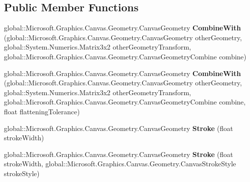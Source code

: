 \subsection*{Public Member Functions}
\begin{DoxyCompactItemize}
\item 
\mbox{\label{interface_microsoft_1_1_graphics_1_1_canvas_1_1_geometry_1_1_i_canvas_geometry_a6815c1deb8e9baa248c965b9a8f12fe7}} 
global\+::\+Microsoft.\+Graphics.\+Canvas.\+Geometry.\+Canvas\+Geometry {\bfseries Combine\+With} (global\+::\+Microsoft.\+Graphics.\+Canvas.\+Geometry.\+Canvas\+Geometry other\+Geometry, global\+::\+System.\+Numerics.\+Matrix3x2 other\+Geometry\+Transform, global\+::\+Microsoft.\+Graphics.\+Canvas.\+Geometry.\+Canvas\+Geometry\+Combine combine)
\item 
\mbox{\label{interface_microsoft_1_1_graphics_1_1_canvas_1_1_geometry_1_1_i_canvas_geometry_a9dbfa5fa955580afeef0c2a26e0281b9}} 
global\+::\+Microsoft.\+Graphics.\+Canvas.\+Geometry.\+Canvas\+Geometry {\bfseries Combine\+With} (global\+::\+Microsoft.\+Graphics.\+Canvas.\+Geometry.\+Canvas\+Geometry other\+Geometry, global\+::\+System.\+Numerics.\+Matrix3x2 other\+Geometry\+Transform, global\+::\+Microsoft.\+Graphics.\+Canvas.\+Geometry.\+Canvas\+Geometry\+Combine combine, float flattening\+Tolerance)
\item 
\mbox{\label{interface_microsoft_1_1_graphics_1_1_canvas_1_1_geometry_1_1_i_canvas_geometry_a9bbabef2bcb23c5f82d026f2b161dac4}} 
global\+::\+Microsoft.\+Graphics.\+Canvas.\+Geometry.\+Canvas\+Geometry {\bfseries Stroke} (float stroke\+Width)
\item 
\mbox{\label{interface_microsoft_1_1_graphics_1_1_canvas_1_1_geometry_1_1_i_canvas_geometry_a6ddac698f9eed90fcbbee6f511c98099}} 
global\+::\+Microsoft.\+Graphics.\+Canvas.\+Geometry.\+Canvas\+Geometry {\bfseries Stroke} (float stroke\+Width, global\+::\+Microsoft.\+Graphics.\+Canvas.\+Geometry.\+Canvas\+Stroke\+Style stroke\+Style)
\item 
\mbox{\label{interface_microsoft_1_1_graphics_1_1_canvas_1_1_geometry_1_1_i_canvas_geometry_ac124844233277683b138a1178fe818ad}} 

\end{DoxyCompactItemize}
